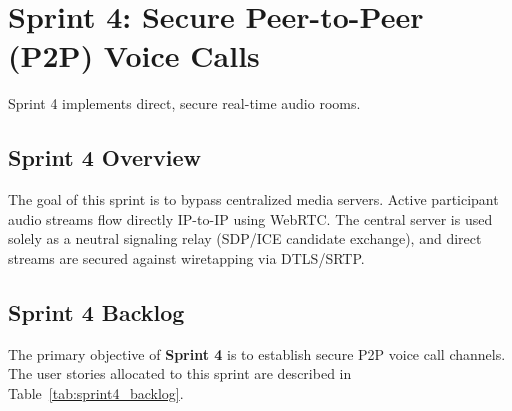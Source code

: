 \section{Sprint 4: Secure Peer-to-Peer (P2P) Voice Calls}
Sprint 4 implements direct, secure real-time audio rooms.

\subsection{Sprint 4 Overview}
The goal of this sprint is to bypass centralized media servers. Active participant audio streams flow directly IP-to-IP using WebRTC. The central server is used solely as a neutral signaling relay (SDP/ICE candidate exchange), and direct streams are secured against wiretapping via DTLS/SRTP.

\subsection{Sprint 4 Backlog}
The primary objective of \textbf{Sprint 4} is to establish secure P2P voice call channels. The user stories allocated to this sprint are described in Table~\ref{tab:sprint4_backlog}.

